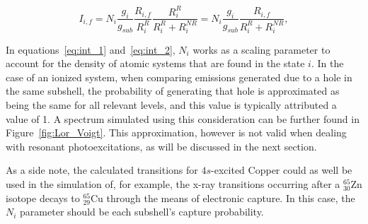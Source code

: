  \begin{equation}
    I_{i,f}=N_i \frac{g_i}{g_{sub}} \frac{R_{i,f}}{R_i^R} \frac{R_i^R}{R_i^R + R_i^{NR}}=N_i \frac{g_i}{g_{sub}} \frac{R_{i,f}}{R_i^R+R_i^{NR}}, \label{eq:int_2}
 \end{equation}

 In equations~\eqref{eq:int_1} and~\eqref{eq:int_2}, $N_i$ works as a scaling parameter to account for the density of atomic systems that are found in the state $i$. In the case of an ionized system, when comparing emissions generated due to a hole in the same subshell, the probability of generating that hole is approximated as being the same for all relevant levels, and this value is typically attributed a value of 1. A spectrum simulated using this consideration can be further found in Figure~\ref{fig:Lor_Voigt}. This approximation, however is not valid when dealing with resonant photoexcitations, as will be discussed in the next section.
 
 As a side note, the calculated transitions for $4s$-excited Copper could as well be used in the simulation of, for example, the x-ray transitions occurring after a $^{65}_{30}$Zn isotope decays to $^{65}_{29}$Cu through the means of electronic capture. In this case, the $N_i$ parameter should be each subshell's capture probability.